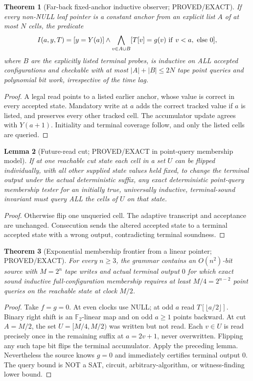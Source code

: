 \documentclass[11pt]{article}
\newtheorem{theorem}{Theorem}
\newtheorem{lemma}[theorem]{Lemma}
\begin{document}
\begin{theorem}[Far-back fixed-anchor inductive observer; PROVED/EXACT]
If every non-NULL leaf pointer is a constant anchor from an explicit list \(A\) of at most \(N\) cells, the predicate
\[
 I(a,y,T)=[y=Y(a)]\land\bigwedge_{v\in A\cup B}
 [T[v]=g(v)\ {\rm if}\ v<a,\ {\rm else}\ 0],
\]
where \(B\) are the explicitly listed terminal probes, is inductive on ALL accepted configurations and checkable with at most \(|A|+|B|\le2N\) tape point queries and polynomial bit work, irrespective of the time lag.
\end{theorem}
\begin{proof}
A legal read points to a listed earlier anchor, whose value is correct in every accepted state. Mandatory write at \(a\) adds the correct tracked value if \(a\) is listed, and preserves every other tracked cell. The accumulator update agrees with \(Y(a+1)\). Initiality and terminal coverage follow, and only the listed cells are queried.
\end{proof}

\begin{lemma}[Future-read cut; PROVED/EXACT in point-query membership model]
If at one reachable cut state each cell in a set \(U\) can be flipped individually, with all other supplied state values held fixed, to change the terminal output under the actual deterministic suffix, any exact deterministic point-query membership tester for an initially true, universally inductive, terminal-sound invariant must query ALL the cells of \(U\) on that state.
\end{lemma}
\begin{proof}
Otherwise flip one unqueried cell. The adaptive transcript and acceptance are unchanged. Consecution sends the altered accepted state to a terminal accepted state with a wrong output, contradicting terminal soundness.
\end{proof}

\begin{theorem}[Exponential membership frontier from a linear pointer; PROVED/EXACT]
For every \(n\ge3\), the grammar contains an \(O(n^2)\)-bit source with \(M=2^n\) tape writes and actual terminal output \(0\) for which exact sound inductive full-configuration membership requires at least \(M/4=2^{n-2}\) point queries on the reachable state at clock \(M/2\).
\end{theorem}
\begin{proof}
Take \(f=g=0\). At even clocks use NULL; at odd \(a\) read \(T[\lfloor a/2\rfloor]\). Binary right shift is an \(\mathbb F_2\)-linear map and on odd \(a\ge1\) points backward. At cut \(A=M/2\), the set \(U=[M/4,M/2)\) was written but not read. Each \(v\in U\) is read precisely once in the remaining suffix at \(a=2v+1\), never overwritten. Flipping any such tape bit flips the terminal accumulator. Apply the preceding lemma. Nevertheless the source knows \(g=0\) and immediately certifies terminal output 0. The query bound is NOT a SAT, circuit, arbitrary-algorithm, or witness-finding lower bound.
\end{proof}
\end{document}
